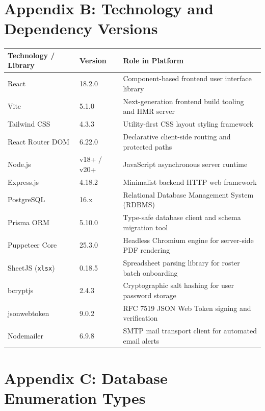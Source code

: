 \section*{Appendix B: Technology and Dependency Versions}

\begin{table}[H]
\centering
\small
\begin{tabularx}{\textwidth}{@{}l l X@{}}
\toprule
\textbf{Technology / Library} & \textbf{Version} & \textbf{Role in Platform} \\
\midrule
React & 18.2.0 & Component-based frontend user interface library \\
Vite & 5.1.0 & Next-generation frontend build tooling and HMR server \\
Tailwind CSS & 4.3.3 & Utility-first CSS layout styling framework \\
React Router DOM & 6.22.0 & Declarative client-side routing and protected paths \\
Node.js & v18+ / v20+ & JavaScript asynchronous server runtime \\
Express.js & 4.18.2 & Minimalist backend HTTP web framework \\
PostgreSQL & 16.x & Relational Database Management System (RDBMS) \\
Prisma ORM & 5.10.0 & Type-safe database client and schema migration tool \\
Puppeteer Core & 25.3.0 & Headless Chromium engine for server-side PDF rendering \\
SheetJS (\texttt{xlsx}) & 0.18.5 & Spreadsheet parsing library for roster batch onboarding \\
bcryptjs & 2.4.3 & Cryptographic salt hashing for user password storage \\
jsonwebtoken & 9.0.2 & RFC 7519 JSON Web Token signing and verification \\
Nodemailer & 6.9.8 & SMTP mail transport client for automated email alerts \\
\bottomrule
\end{tabularx}
\end{table}

\section*{Appendix C: Database Enumeration Types}

